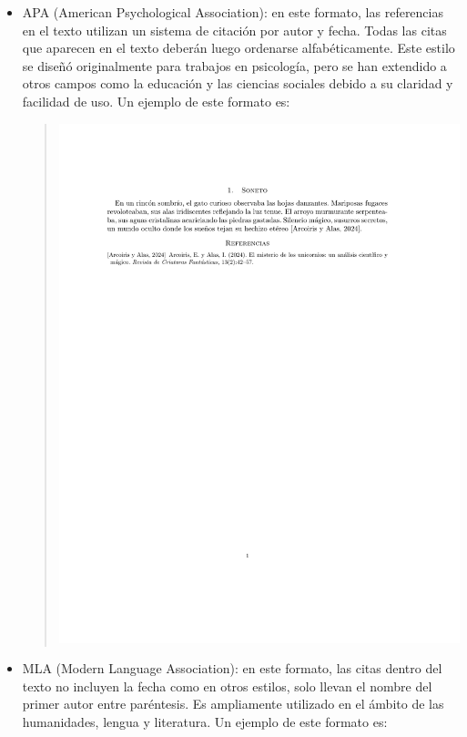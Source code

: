 \begin{itemize}
    \item APA (American Psychological Association): en este formato, las referencias en el texto utilizan un sistema de citación por autor y fecha. Todas las citas que aparecen en el texto deberán luego ordenarse alfabéticamente. Este estilo se diseñó originalmente para trabajos en psicología, pero se han extendido a otros campos como la educación y las ciencias sociales debido a su claridad y facilidad de uso. Un ejemplo de este formato es:
    \begin{quote}
        \includegraphics[scale=0.6, trim={2cm 20cm 3cm 3cm}, clip]{images/apa.pdf}
    \end{quote}
    \item MLA (Modern Language Association): en este formato, las citas dentro del texto no incluyen la fecha como en otros estilos, solo llevan el nombre del primer autor entre paréntesis. Es ampliamente utilizado en el ámbito de las humanidades, lengua y literatura. Un ejemplo de este formato es:

\end{itemize}
